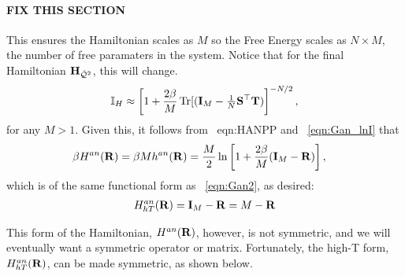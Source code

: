 \paragraph{FIX THIS SECTION}
This ensures the Hamiltonian scales as $M$ so the Free Energy scales as $N \times M$, the
number of free paramaters in the system.
Notice that for the final \LayerQualitySquared Hamiltonian $\mathbf{H}_{\bar{\mathcal{Q}}^{2}}$, this will change.
\begin{align}
  \label{eqn:I_9}
    \mathbb{I}_{H}\approx  \left[1  + \frac{2\beta}{M}\operatorname{Tr}[(\mathbf{I}_{M}-\tfrac{1}{N}{\mathbf{S}}^{\top}{\mathbf{T}})\right]^{-N/2} ,
\end{align}
for any $M>1$.
Given this, it follows from \EQN~{eqn:HANPP} and \EQN~\ref{eqn:Gan_lnI} that
\begin{align}
\label{eqn:GANmat}
\beta H^{an}(\mathbf{R}) = \beta M h^{an}(\mathbf{R})
  &=  \frac{M}{2}\ln \left[1 + \frac{2\beta}{M}(\mathbf{I}_{M}-\mathbf{R})\right]  ,
\end{align}
which is of the same functional form as \EQN~\ref{eqn:Gan2}, as desired:
\begin{align}
\label{eqn:GANHTmatR}
H^{an}_{hT}(\mathbf{R}) = \mathbf{I}_{M}-\mathbf{R} = M-\mathbf{R}
\end{align}




This form of the Hamiltonian, $H^{an}(\mathbf{R})$, however, is not symmetric, and we will
eventually want a symmetric operator or matrix.
Fortunately, the high-T form, $H^{an}_{hT}(\mathbf{R})$, can be made symmetric, as
shown below.
